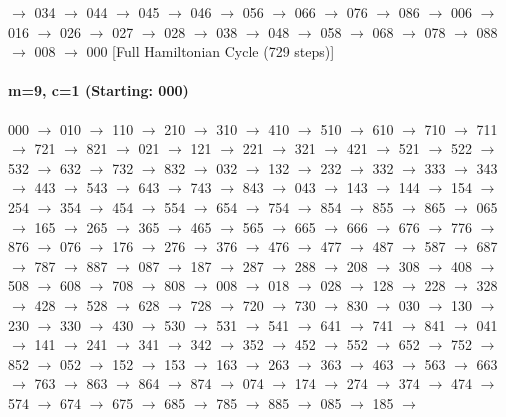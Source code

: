 $\rightarrow$ 034 $\rightarrow$ 044 $\rightarrow$ 045 $\rightarrow$ 046 $\rightarrow$ 056 $\rightarrow$ 066 $\rightarrow$ 076 $\rightarrow$ 086 $\rightarrow$ 006 $\rightarrow$ 016 $\rightarrow$ 026 $\rightarrow$ 027 $\rightarrow$ 028 $\rightarrow$ 038 $\rightarrow$ 048 $\rightarrow$ 058 $\rightarrow$ 068 $\rightarrow$ 078 $\rightarrow$ 088 $\rightarrow$ 008 $\rightarrow$ 000 
[Full Hamiltonian Cycle (729 steps)]


\paragraph{ m=9, c=1 (Starting: 000)}



000 $\rightarrow$ 010 $\rightarrow$ 110 $\rightarrow$ 210 $\rightarrow$ 310 $\rightarrow$ 410 $\rightarrow$ 510 $\rightarrow$ 610 $\rightarrow$ 710 $\rightarrow$ 711 $\rightarrow$ 721 $\rightarrow$ 821 $\rightarrow$ 021 $\rightarrow$ 121 $\rightarrow$ 221 $\rightarrow$ 321 $\rightarrow$ 421 $\rightarrow$ 521 $\rightarrow$ 522 $\rightarrow$ 532 $\rightarrow$ 632 $\rightarrow$ 732 $\rightarrow$ 832 $\rightarrow$ 032 $\rightarrow$ 132 $\rightarrow$ 232 $\rightarrow$ 332 $\rightarrow$ 333 $\rightarrow$ 343 $\rightarrow$ 443 $\rightarrow$ 543 $\rightarrow$ 643 $\rightarrow$ 743 $\rightarrow$ 843 $\rightarrow$ 043 $\rightarrow$ 143 $\rightarrow$ 144 $\rightarrow$ 154 $\rightarrow$ 254 $\rightarrow$ 354 $\rightarrow$ 454 $\rightarrow$ 554 $\rightarrow$ 654 $\rightarrow$ 754 $\rightarrow$ 854 $\rightarrow$ 855 $\rightarrow$ 865 $\rightarrow$ 065 $\rightarrow$ 165 $\rightarrow$ 265 $\rightarrow$ 365 $\rightarrow$ 465 $\rightarrow$ 565 $\rightarrow$ 665 $\rightarrow$ 666 $\rightarrow$ 676 $\rightarrow$ 776 $\rightarrow$ 876 $\rightarrow$ 076 $\rightarrow$ 176 $\rightarrow$ 276 $\rightarrow$ 376 $\rightarrow$ 476 $\rightarrow$ 477 $\rightarrow$ 487 $\rightarrow$ 587 $\rightarrow$ 687 $\rightarrow$ 787 $\rightarrow$ 887 $\rightarrow$ 087 $\rightarrow$ 187 $\rightarrow$ 287 $\rightarrow$ 288 $\rightarrow$ 208 $\rightarrow$ 308 $\rightarrow$ 408 $\rightarrow$ 508 $\rightarrow$ 608 $\rightarrow$ 708 $\rightarrow$ 808 $\rightarrow$ 008 $\rightarrow$ 018 $\rightarrow$ 028 $\rightarrow$ 128 $\rightarrow$ 228 $\rightarrow$ 328 $\rightarrow$ 428 $\rightarrow$ 528 $\rightarrow$ 628 $\rightarrow$ 728 $\rightarrow$ 720 $\rightarrow$ 730 $\rightarrow$ 830 $\rightarrow$ 030 $\rightarrow$ 130 $\rightarrow$ 230 $\rightarrow$ 330 $\rightarrow$ 430 $\rightarrow$ 530 $\rightarrow$ 531 $\rightarrow$ 541 $\rightarrow$ 641 $\rightarrow$ 741 $\rightarrow$ 841 $\rightarrow$ 041 $\rightarrow$ 141 $\rightarrow$ 241 $\rightarrow$ 341 $\rightarrow$ 342 $\rightarrow$ 352 $\rightarrow$ 452 $\rightarrow$ 552 $\rightarrow$ 652 $\rightarrow$ 752 $\rightarrow$ 852 $\rightarrow$ 052 $\rightarrow$ 152 $\rightarrow$ 153 $\rightarrow$ 163 $\rightarrow$ 263 $\rightarrow$ 363 $\rightarrow$ 463 $\rightarrow$ 563 $\rightarrow$ 663 $\rightarrow$ 763 $\rightarrow$ 863 $\rightarrow$ 864 $\rightarrow$ 874 $\rightarrow$ 074 $\rightarrow$ 174 $\rightarrow$ 274 $\rightarrow$ 374 $\rightarrow$ 474 $\rightarrow$ 574 $\rightarrow$ 674 $\rightarrow$ 675 $\rightarrow$ 685 $\rightarrow$ 785 $\rightarrow$ 885 $\rightarrow$ 085 $\rightarrow$ 185 $\rightarrow$ 